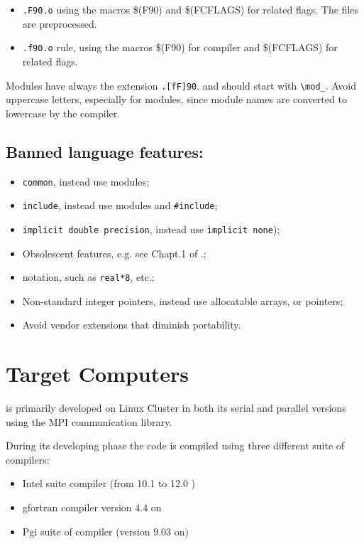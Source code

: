  \begin{itemize}
 \item
  \verb=.F90.o=  using the macros {\macro \$(F90)} and 
{\macro \$(FCFLAGS)} for related flags. The files are preprocessed.
 \item
  \verb=.f90.o= rule, using the macros {\macro \$(F90)} for compiler and 
{\macro \$(FCFLAGS)} for related flags.
 \end{itemize}

Modules have always the extension \verb=.[fF]90=. and should start with \verb=\mod_=.
Avoid uppercase letters, especially for modules, since module names
are converted to lowercase by the compiler.
 
\subsection{ Banned \oldfort language features:}

 \begin{itemize}
 \item {\tt common}, instead use modules;
 \item {\tt include}, instead use modules and \verb=#include=;
 \item {\tt implicit double precision}, instead use {\tt implicit none});
 \item  Obsolescent \oldfort features, e.g. see Chapt.1 of \cite{Kerrigan}.;
 \item \oldfort notation, such as \verb=real*8=, etc.;
 \item  Non-standard \oldfort integer pointers, instead use allocatable
   arrays, or \fort pointers;
 \item  Avoid vendor extensions that diminish portability.
 \end{itemize}


\section{Target Computers}

\PR is primarily developed on Linux Cluster in both its serial and parallel versions using the MPI communication library. 

During its developing phase the code is compiled using three different suite of compilers:

\begin{itemize}
\item Intel suite compiler (from 10.1 to 12.0 )
\item gfortran compiler  version 4.4 on 
\item Pgi suite of compiler (version 9.03 on) 
\end{itemize}

